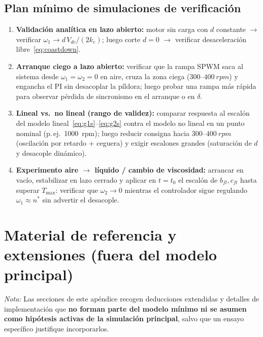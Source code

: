 \documentclass[11pt,a4paper,oneside]{report}
\theoremstyle{definition}
\theoremstyle{remark}
\begin{document}
\section{Plan mínimo de simulaciones de verificación}
\begin{enumerate}
  \item \textbf{Validación analítica en lazo abierto:} motor sin carga con $d$
        constante $\to$ verificar $\omega_1 \to d\,V_{dc}/(2k_e)$; luego corte
        $d=0$ $\to$ verificar desaceleración libre~\eqref{eq:coastdown}.
  \item \textbf{Arranque ciego a lazo abierto:} verificar que la rampa SPWM
        saca al sistema desde $\omega_1=\omega_2=0$ en aire, cruza la zona
        ciega ($300\text{--}\SI{400}{rpm}$) y engancha el PI sin desacoplar la
        píldora; luego probar una rampa más rápida para observar pérdida de
        sincronismo en el arranque o en $\delta$.
  \item \textbf{Lineal vs.\ no lineal (rango de validez):} comparar respuesta al
        escalón del modelo lineal~\eqref{eq:g1s}--\eqref{eq:g2s} contra el
        modelo no lineal en un punto nominal (p.\,ej.\ \SI{1000}{rpm}); luego
        reducir consigna hacia $300\text{--}\SI{400}{rpm}$ (oscilación por
        retardo + ceguera) y exigir escalones grandes (saturación de $d$ y
        desacople dinámico).
  \item \textbf{Experimento aire $\to$ líquido / cambio de viscosidad:}
        arrancar en vacío, estabilizar en lazo cerrado y aplicar en $t=t_0$ el
        escalón de $b_{fl}, c_{fl}$ hasta superar $T_{\max}$: verificar que
        $\omega_2 \to 0$ mientras el controlador sigue regulando
        $\omega_1 \approx n^\ast$ sin advertir el desacople.
\end{enumerate}

\appendix
\chapter{Material de referencia y extensiones (fuera del modelo principal)}
\label{ap:referencia}
\noindent\textit{Nota:} Las secciones de este apéndice recogen deducciones
extendidas y detalles de implementación que \textbf{no forman parte del modelo
mínimo ni se asumen como hipótesis activas de la simulación principal}, salvo
que un ensayo específico justifique incorporarlos.
\end{document}
